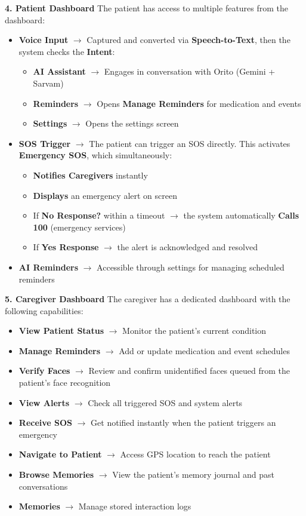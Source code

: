 \begin{flushleft}
\textbf{4. Patient Dashboard}
The patient has access to multiple features from the dashboard:
\begin{itemize}
    \item \textbf{Voice Input} $\rightarrow$ Captured and converted via \textbf{Speech-to-Text}, then the system checks the \textbf{Intent}:
    \begin{itemize}
        \item \textbf{AI Assistant} $\rightarrow$ Engages in conversation with Orito (Gemini + Sarvam)
        \item \textbf{Reminders} $\rightarrow$ Opens \textbf{Manage Reminders} for medication and events
        \item \textbf{Settings} $\rightarrow$ Opens the settings screen
    \end{itemize}
    \item \textbf{SOS Trigger} $\rightarrow$ The patient can trigger an SOS directly. This activates \textbf{Emergency SOS}, which simultaneously:
    \begin{itemize}
        \item \textbf{Notifies Caregivers} instantly
        \item \textbf{Displays} an emergency alert on screen
        \item If \textbf{No Response?} within a timeout $\rightarrow$ the system automatically \textbf{Calls 100} (emergency services)
        \item If \textbf{Yes Response} $\rightarrow$ the alert is acknowledged and resolved
    \end{itemize}
    \item \textbf{AI Reminders} $\rightarrow$ Accessible through settings for managing scheduled reminders
\end{itemize}

\textbf{5. Caregiver Dashboard}
The caregiver has a dedicated dashboard with the following capabilities:
\begin{itemize}
    \item \textbf{View Patient Status} $\rightarrow$ Monitor the patient's current condition
    \item \textbf{Manage Reminders} $\rightarrow$ Add or update medication and event schedules
    \item \textbf{Verify Faces} $\rightarrow$ Review and confirm unidentified faces queued from the patient's face recognition
    \item \textbf{View Alerts} $\rightarrow$ Check all triggered SOS and system alerts
    \item \textbf{Receive SOS} $\rightarrow$ Get notified instantly when the patient triggers an emergency
    \item \textbf{Navigate to Patient} $\rightarrow$ Access GPS location to reach the patient
    \item \textbf{Browse Memories} $\rightarrow$ View the patient's memory journal and past conversations
    \item \textbf{Memories} $\rightarrow$ Manage stored interaction logs
\end{itemize}


\end{flushleft}
